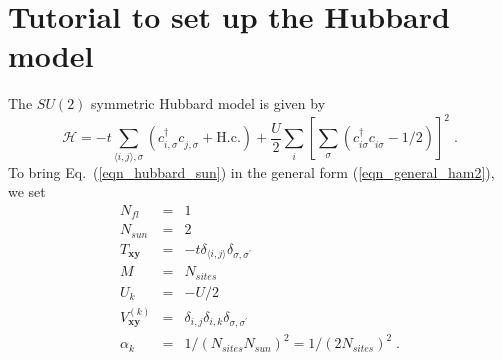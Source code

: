 \section{Tutorial to set up the Hubbard model}
The $SU(2)$ symmetric Hubbard model is given by
\begin{equation}
\label{eqn_hubbard_sun}
\mathcal{H}=
-t\sum\limits_{\langle i,j\rangle,\sigma} 
\left(c^{\dagger}_{i,\sigma} c^{\phantom\dagger}_{j,\sigma} + \text{H.c.}
\right)
+ \frac{U}{2}\sum\limits_{i}\left[
\sum\limits_{\sigma}
\left(  c^{\dagger}_{i\sigma} c^{\phantom\dagger}_{i\sigma}  -1/2 \right) \right]^{2}\;.
\end{equation}
To bring Eq.~(\ref{eqn_hubbard_sun}) in the general form (\ref{eqn_general_ham2}), we set
\begin{eqnarray}
N_{fl}&=&1\nonumber\\
N_{sun}&=&2\nonumber\\
T_{\bm{x}\bm{y}}&=&-t\delta_{\langle i,j\rangle}\delta_{\sigma,\sigma^{\prime}}\nonumber\\
M&=&N_{sites}\nonumber\\
U_{k}&=&-U/2\nonumber\\
V_{\bm{x}\bm{y}}^{(k)}&=&\delta_{i,j}\delta_{i,k}\delta_{\sigma,\sigma^{\prime}}\nonumber\\
\alpha_{k}&=&1/(N_{sites}N_{sun})^{2}=1/(2 N_{sites})^{2}\;.
\end{eqnarray}